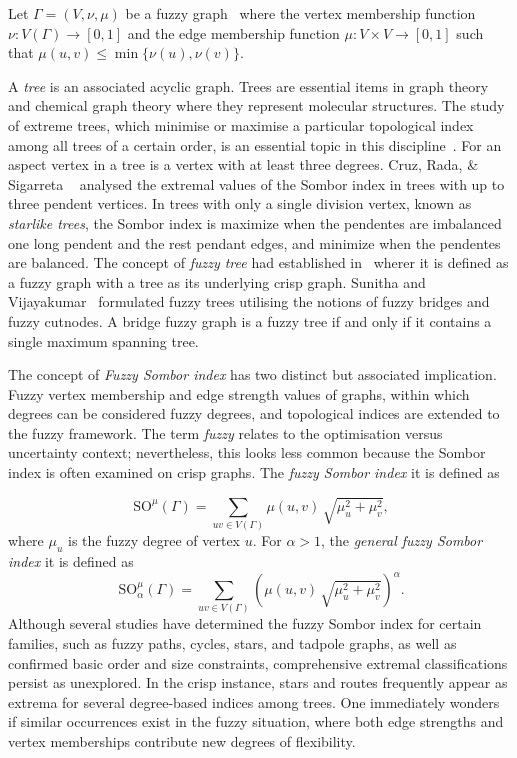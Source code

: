 \documentclass[12pt]{amsart}
\newcommand{\SOG}{\mathrm{SO}^{\mu}}
\begin{document}
Let $\Gamma=(V,\nu,\mu)$  be a fuzzy graph~\cite{sunitha1999fuzzytrees} where the vertex membership function $\nu:V(\Gamma)\to [0,1]$ and the edge membership function $\mu:V\times V\to[0,1]$ such that $\mu(u,v)\leqslant 
 \min\{\nu(u),\nu(v)\}.$

A \textit{tree} is an associated acyclic graph. Trees are essential items in graph theory and chemical graph theory where they represent molecular structures. The study of extreme trees, which minimise or maximise a particular topological index among all trees of a certain order, is an essential topic in this discipline~\cite{cruz2020extremal}. For an aspect vertex in a tree is a vertex with at least three degrees. Cruz, Rada, \& Sigarreta ~\cite{cruz2021threependent} analysed the extremal values of the Sombor index in trees with up to three pendent vertices. In trees with only a single division vertex, known as \emph{starlike trees}, the Sombor index is maximize when the pendentes are imbalanced one long pendent and the rest pendant edges, and minimize when the pendentes are balanced. The concept of {\it fuzzy tree} had established in~\cite{sunitha1999fuzzytrees} wherer it is defined as a fuzzy graph with a tree as its underlying crisp graph. Sunitha and Vijayakumar~\cite{sunitha1999fuzzytrees} formulated fuzzy trees utilising the notions of fuzzy bridges and fuzzy cutnodes. A bridge fuzzy graph is a fuzzy tree if and only if it contains a single maximum spanning tree.

The concept of {\it Fuzzy Sombor index} has two distinct but associated implication. Fuzzy vertex membership and edge strength values of graphs, within which degrees can be considered fuzzy degrees, and topological indices are extended to the fuzzy framework.
The term {\it fuzzy} relates to the optimisation versus uncertainty context; nevertheless, this looks less common because the Sombor index is often examined on crisp graphs.  The \textit{fuzzy Sombor index} it is defined as

\begin{equation}~\label{eqq1basicsombor}
 \SOG(\Gamma)=\sum_{uv\in V(\Gamma)}\mu(u,v)\,\sqrt{\mu_u^2+\mu_v^2},   
\end{equation}
where $\mu_u$ is the fuzzy degree of vertex $u$. For $\alpha>1$, the \textit{general fuzzy Sombor index} it is defined as
\begin{equation}~\label{eqq1advsombor}
 \SOG_{\alpha}(\Gamma)=\sum_{uv\in V(\Gamma)}\left(\mu(u,v)\,\sqrt{\mu_u^2+\mu_v^2}\right)^{\alpha}.
\end{equation}
Although several studies have determined the fuzzy Sombor index for certain families, such as fuzzy paths, cycles, stars, and tadpole graphs, as well as confirmed basic order and size constraints, comprehensive extremal classifications persist as unexplored. 
In the crisp instance, stars and routes frequently appear as extrema for several degree-based indices among trees. One immediately wonders if similar occurrences exist in the fuzzy situation, where both edge strengths and vertex memberships contribute new degrees of flexibility.
\end{document}
